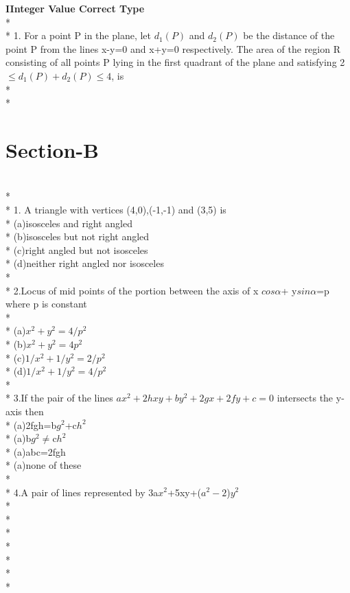 \documentclass{article}
\begin{document}
{\Large \textbf{I\enspace Integer Value Correct Type}}\\*\\*
{\large 1. For a point P in the plane, let $d_1(P)$ and $d_2(P)$ be the distance of the point P from the lines x-y=0 and x+y=0 respectively. The area of the region R consisting of all points P lying in the first quadrant of the plane and satisfying 2$\leq d_1(P)+d_2(P) \leq 4$, is\\*\\*}
\section{\LARGE Section-B}\\*\\*
{\large 1. A triangle with vertices (4,0),(-1,-1) and (3,5) is\\*
(a)\enspace isosceles and right angled\\*
(b)\enspace isosceles but not right angled\\*
(c)\enspace right angled but not isosceles\\*
(d)\enspace neither right angled nor isosceles\\*\\*
2.\enspace Locus of mid points of the portion between the axis of x $cos\alpha$+ y$sin \alpha$=p where p is constant\\*\\*
(a)\enspace $x^2+y^2=4/p^2$\\*
(b)\enspace $x^2+y^2=4p^2$\\*
(c)\enspace $1/x^2+1/y^2=2/p^2$\\*
(d)\enspace $1/x^2+1/y^2=4/p^2$\\*\\*
3.\enspace If the pair of the lines $ax^2+2hxy+by^2+2gx+2fy+c=0$ intersects the y-axis then\\*
(a)\enspace 2fgh=b$g^2$+c$h^2$\\*
(a)\enspace b$g^2\neq$c$h^2$\\*
(a)\enspace abc=2fgh\\*
(a)\enspace none of these\\*\\*
4.\enspace A pair of lines represented by 3a$x^2$+5xy+($a^2-2$)$y^2$\\*\\*\\*\\*\\*\\*\\*
}
\end{document}
